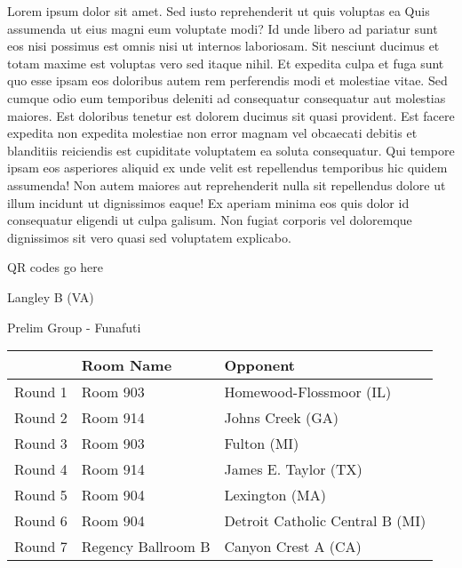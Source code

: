 \documentclass{article}%
\begin{document}
\vspace*{8pt}%
\linebreak%
\newline%
\newline%
Lorem ipsum dolor sit amet. Sed iusto reprehenderit ut quis voluptas ea Quis assumenda ut eius magni eum voluptate modi? Id unde libero ad pariatur sunt eos nisi possimus est omnis nisi ut internos laboriosam. Sit nesciunt ducimus et totam maxime est voluptas vero sed itaque nihil. Et expedita culpa et fuga sunt quo esse ipsam eos doloribus autem rem perferendis modi et molestiae vitae.\newline%
\newline%
Sed cumque odio eum temporibus deleniti ad consequatur consequatur aut molestias maiores. Est doloribus tenetur est dolorem ducimus sit quasi provident. Est facere expedita non expedita molestiae non error magnam vel obcaecati debitis et blanditiis reiciendis est cupiditate voluptatem ea soluta consequatur. Qui tempore ipsam eos asperiores aliquid ex unde velit est repellendus temporibus hic quidem assumenda!\newline%
\newline%
Non autem maiores aut reprehenderit nulla sit repellendus dolore ut illum incidunt ut dignissimos eaque! Ex aperiam minima eos quis dolor id consequatur eligendi ut culpa galisum. Non fugiat corporis vel doloremque dignissimos sit vero quasi sed voluptatem explicabo.\newline%
\newline%
%
\vspace*{30pt}%
\begin{center}%
\begin{Huge}%
QR codes go here%
\end{Huge}%
\end{center}%
\newpage%
%
\begin{center}%
\begin{Huge}%
Langley B (VA)%
\end{Huge}%
\vspace*{8pt}%
\linebreak%
\begin{Large}%
Prelim Group {-} Funafuti%
\end{Large}%
\end{center}%
\begin{tabularx}{\textwidth}{|c|Y|Y|}%
\hline%
&Room Name&Opponent\\%
\hline%
Round 1&Room 903&Homewood{-}Flossmoor (IL)\\%
Round 2&Room 914&Johns Creek (GA)\\%
Round 3&Room 903&Fulton (MI)\\%
Round 4&Room 914&James E. Taylor (TX)\\%
Round 5&Room 904&Lexington (MA)\\%
Round 6&Room 904&Detroit Catholic Central B (MI)\\%
Round 7&Regency Ballroom B&Canyon Crest A (CA)\\%
\hline%
\end{tabularx}%
\end{document}
